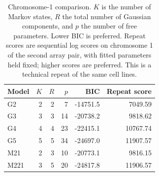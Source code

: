 \begin{table}[htbp]
\centering
\small
\caption{Chromosome-1 comparison. $K$ is the number of Markov states, $R$ the total number of Gaussian components, and $p$ the number of free parameters. Lower BIC is preferred. Repeat scores are sequential log scores on chromosome 1 of the second array pair, with fitted parameters held fixed; higher scores are preferred. This is a technical repeat of the same cell lines.}
\label{tab:genomic-comparison}
\begin{tabular}{lrrrrr}
\toprule
Model & $K$ & $R$ & $p$ & BIC & Repeat score \\
\midrule
G2 & 2 & 2 & 7 & -14751.5 & 7049.59 \\
G3 & 3 & 3 & 14 & -20738.2 & 9818.62 \\
G4 & 4 & 4 & 23 & -22415.1 & 10767.74 \\
G5 & 5 & 5 & 34 & -24697.0 & 11907.57 \\
M21 & 2 & 3 & 10 & -20773.1 & 9816.15 \\
M221 & 3 & 5 & 20 & -24817.8 & 11906.57 \\
\bottomrule
\end{tabular}
\end{table}
